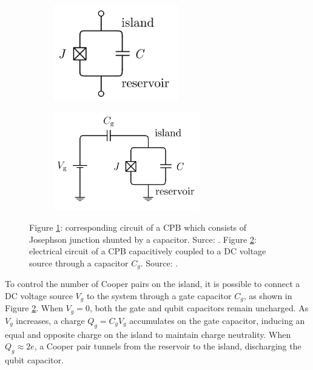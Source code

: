 \begin{figure}[ht!]
    \centering
    \begin{subfigure}{0.45\textwidth}
        \centering
        \includegraphics[width=0.60\textwidth]{figures/png/CPB.png}
        \subcaption{}
        \label{fig:CPB}
    \end{subfigure}
    \hfill
    \begin{subfigure}{0.45\textwidth}
        \centering
        \includegraphics[width=0.70\textwidth]{figures/png/CPB_circuit.png}
        \subcaption{}
        \label{fig:CPB_circuit}
    \end{subfigure}
    \caption{Figure \ref{fig:CPB}: corresponding circuit of a CPB which consists of Josephson junction shunted by a capacitor. Surce: \cite{manenti_quantum_2023}. Figure \ref{fig:CPB_circuit}: electrical circuit of a CPB capacitively coupled to a DC voltage source through a capacitor $C_g$. Source: \cite{manenti_quantum_2023}.}
    \label{fig:CPB_general}
\end{figure}

To control the number of Cooper pairs on the island, it is possible to connect a DC voltage source $V_g$ to the system through a gate capacitor $C_g$, as shown in Figure \ref{fig:CPB_circuit}.
When $V_g = 0$, both the gate and qubit capacitors remain uncharged. 
As $V_g$ increases, a charge $Q_g = C_g V_g$ accumulates on the gate capacitor, inducing an equal and opposite charge on the island to maintain charge neutrality. 
When $Q_g \approx 2e$, a Cooper pair tunnels from the reservoir to the island, discharging the qubit capacitor. \\

